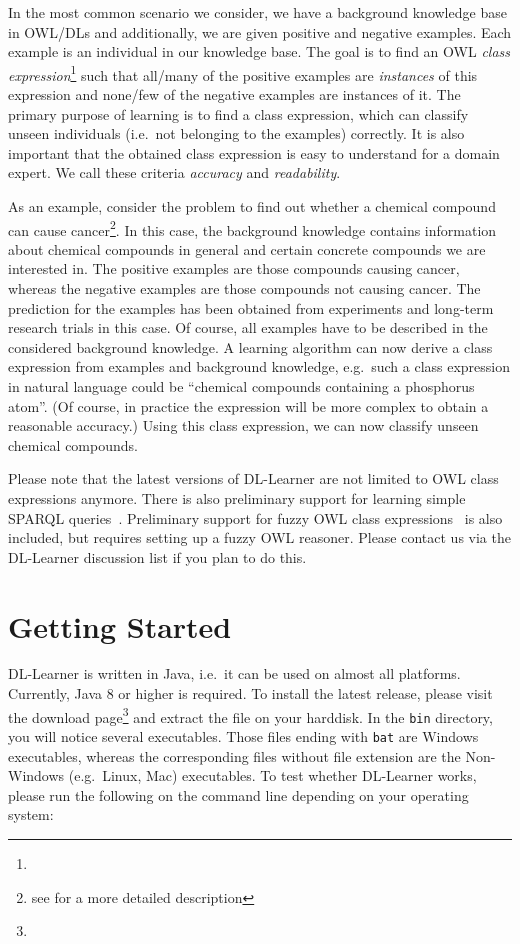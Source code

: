 \documentclass[a4paper,12pt]{scrartcl}
\begin{document}
In the most common scenario we consider, we have a background knowledge base in OWL/DLs and additionally, we are given positive and negative examples. Each example is an individual in our knowledge base. The goal is to find an OWL \emph{class expression}\footnote{\owlce} such that all/many of the positive examples are \emph{instances} of this expression and none/few of the negative examples are instances of it. The primary purpose of learning is to find a class expression, which can classify unseen individuals (i.e.~not belonging to the examples) correctly. It is also important that the obtained class expression is easy to understand for a domain expert. We call these criteria \emph{accuracy} and \emph{readability}.

As an example, consider the problem to find out whether a chemical compound can cause cancer\footnote{see \carc{} for a more detailed description}. In this case, the background knowledge contains information about chemical compounds in general and certain concrete compounds we are interested in. The positive examples are those compounds causing cancer, whereas the negative examples are those compounds not causing cancer. The prediction for the examples has been obtained from experiments and long-term research trials in this case. Of course, all examples have to be described in the considered background knowledge. A learning algorithm can now derive a class expression from examples and background knowledge, e.g.~such a class expression in natural language could be ``chemical compounds containing a phosphorus atom''. (Of course, in practice the expression will be more complex to obtain a reasonable accuracy.) Using this class expression, we can now classify unseen chemical compounds.

Please note that the latest versions of DL-Learner are not limited to OWL class expressions anymore. There is also preliminary support for learning simple SPARQL queries~\cite{autosparql}. Preliminary support for fuzzy OWL class expressions~\cite{fuzzy} is also included, but requires setting up a fuzzy OWL reasoner. Please contact us via the DL-Learner discussion list if you plan to do this.

\section{Getting Started}
\label{sec:start}

DL-Learner is written in Java, i.e.~it can be used on almost all platforms. Currently, Java 8 or higher is required. To install the latest release, please visit the download page\footnote{\dldownload} and extract the file on your harddisk. In the \verb|bin| directory, you will notice several executables. Those files ending with \verb|bat| are Windows executables, whereas the corresponding files without file extension are the Non-Windows (e.g.~Linux, Mac) executables. To test whether DL-Learner works, please run the following on the command line depending on your operating system:
\end{document}
